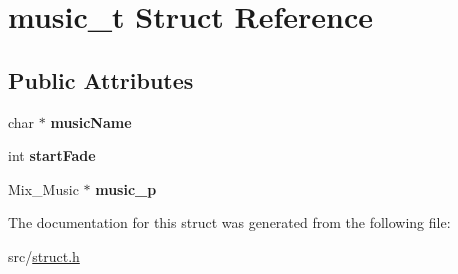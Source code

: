 \hypertarget{structmusic__t}{}\section{music\+\_\+t Struct Reference}
\label{structmusic__t}
\subsection*{Public Attributes}
\begin{DoxyCompactItemize}
\item 
\mbox{\label{structmusic__t_a3517629d28967678fdbc7dae0758f1c5}} 
char $\ast$ {\bfseries music\+Name}
\item 
\mbox{\label{structmusic__t_acdd282289201fab37d13bee165d278e9}} 
int {\bfseries start\+Fade}
\item 
\mbox{\label{structmusic__t_ac9d08202226426729eaf10c850ab359e}} 
Mix\+\_\+\+Music $\ast$ {\bfseries music\+\_\+p}
\end{DoxyCompactItemize}


The documentation for this struct was generated from the following file\+:\begin{DoxyCompactItemize}
\item 
src/\hyperlink{struct_8h}{struct.\+h}\end{DoxyCompactItemize}
